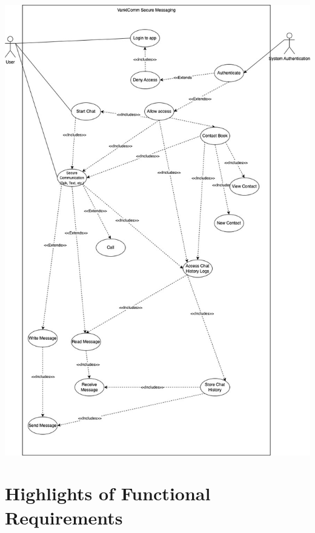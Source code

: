 \documentclass[]{article}
\begin{document}
\includegraphics[width=\paperwidth,height=0.75\paperheight,keepaspectratio]{UseCase.jpg}



%
%
%

\section{Highlights of Functional Requirements}
\label{sec:functional_requirements}
\end{document}
